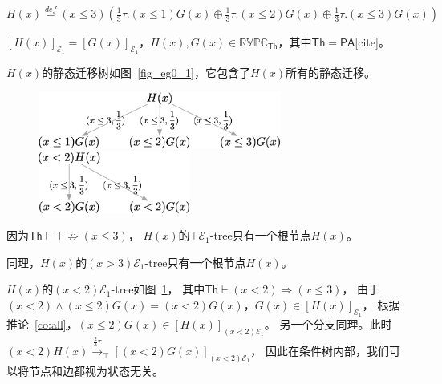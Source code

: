 \begin{example}
   $H(x)\stackrel{def}{=}(x\leq 3)(\frac{1}{3}\tau.(x\leq 1)G(x)\oplus\frac{1}{3}\tau.(x\leq 2)G(x)\oplus\frac{1}{3}\tau.(x\leq 3)G(x))$

   $[H(x)]_{\mathcal{E}_1} = [G(x)]_{\mathcal{E}_1}$，$H(x),G(x)\in \mathbb{RVPC}_{\mathsf{Th}}$，其中$\mathsf{Th}=\mathsf{PA}$[cite]。

   $H(x)$的静态迁移树如图~\ref{fig_eg0_1}，它包含了$H(x)$所有的静态迁移。
   \begin{figure}[!htp]
      \begin{minipage}{0.6\textwidth}
         \centering
         \includegraphics[width=8cm]{../figures/example0_1.png}
         \caption[]{}
         \label{fig_eg0_1}
   \end{minipage}\hfill
   \begin{minipage}{0.45\textwidth}
      \centering
      \includegraphics[width=5cm]{../figures/example0_2.png}
      \caption[]{}
       \label{fig_eg0_2}
   \end{minipage}
    \end{figure}

   因为$\mathsf{Th}\vdash \top \not\Rightarrow (x\leq 3)$，
   $H(x)$的$\top\mathcal{E}_1$-tree只有一个根节点$H(x)$。

   同理，$H(x)$的$(x>3)\mathcal{E}_1$-tree只有一个根节点$H(x)$。

   $H(x)$的$(x<2)\mathcal{E}_1$-tree如图~\ref{fig_eg0_2}，
   其中$\mathsf{Th}\vdash (x<2)\Rightarrow (x\leq 3)$，
   由于$(x<2)\wedge(x\leq 2)G(x) = (x<2)G(x)$，$G(x)\in[H(x)]_{\mathcal{E}_1}$，
   根据推论~\ref{co:all}，$(x\leq 2)G(x)\in [H(x)]_{(x<2)\mathcal{E}_1}$。
   另一个分支同理。此时$(x<2)H(x)\stackrel{\frac{2}{3}\tau}{\rightarrow}_{\top}[(x<2)G(x)]_{(x<2)\mathcal{E_1}}$，
   因此在条件树内部，我们可以将节点和边都视为状态无关。

\end{example}
